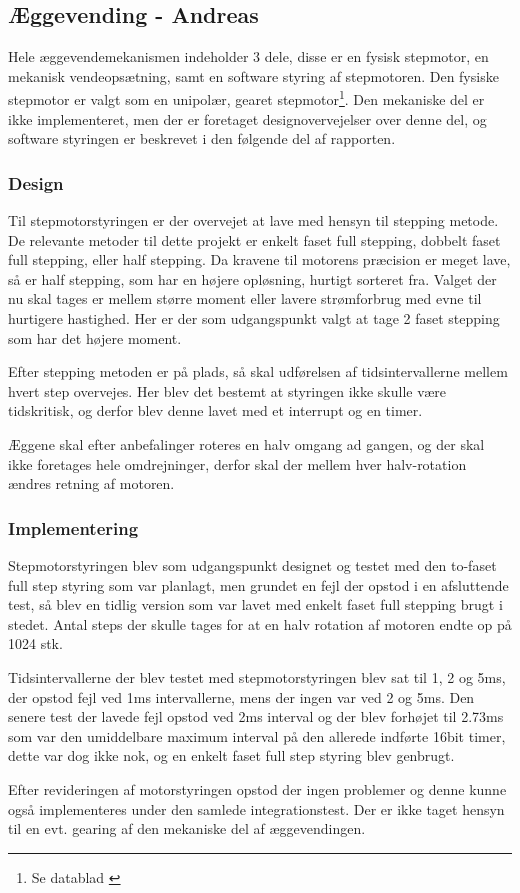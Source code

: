 \newpage
\subsection{Æggevending - Andreas}
Hele æggevendemekanismen indeholder 3 dele, disse er en fysisk stepmotor, en mekanisk vendeopsætning, samt en software styring af stepmotoren.
Den fysiske stepmotor er valgt som en unipolær, gearet stepmotor\footnote{Se datablad \cite{Stepmotor}}. Den mekaniske del er ikke implementeret, men der er foretaget designovervejelser over denne del, og software styringen er beskrevet i den følgende del af rapporten.

\subsubsection{Design}
Til stepmotorstyringen er der overvejet at lave med hensyn til stepping metode. De relevante metoder til dette projekt er enkelt faset full stepping, dobbelt faset full stepping, eller half stepping. Da kravene til motorens præcision er meget lave, så er half stepping, som har en højere opløsning, hurtigt sorteret fra. Valget der nu skal tages er mellem større moment eller lavere strømforbrug med evne til hurtigere hastighed. Her er der som udgangspunkt valgt at tage 2 faset stepping som har det højere moment.

Efter stepping metoden er på plads, så skal udførelsen af tidsintervallerne mellem hvert step overvejes. Her blev det bestemt at styringen ikke skulle være tidskritisk, og derfor blev denne lavet med et interrupt og en timer.

Æggene skal efter anbefalinger roteres en halv omgang ad gangen, og der skal ikke foretages hele omdrejninger, derfor skal der mellem hver halv-rotation ændres retning af motoren.

\subsubsection{Implementering}
Stepmotorstyringen blev som udgangspunkt designet og testet med den to-faset full step styring som var planlagt, men grundet en fejl der opstod i en afsluttende test, så blev en tidlig version som var lavet med enkelt faset full stepping brugt i stedet.
Antal steps der skulle tages for at en halv rotation af motoren endte op på 1024 stk.

Tidsintervallerne der blev testet med stepmotorstyringen blev sat til 1, 2 og 5ms, der opstod fejl ved 1ms intervallerne, mens der ingen var ved 2 og 5ms. Den senere test der lavede fejl opstod ved 2ms interval og der blev forhøjet til 2.73ms som var den umiddelbare maximum interval på den allerede indførte 16bit timer, dette var dog ikke nok, og en enkelt faset full step styring blev genbrugt.

Efter revideringen af motorstyringen opstod der ingen problemer og denne kunne også implementeres under den samlede integrationstest. Der er ikke taget hensyn til en evt. gearing af den mekaniske del af æggevendingen.
